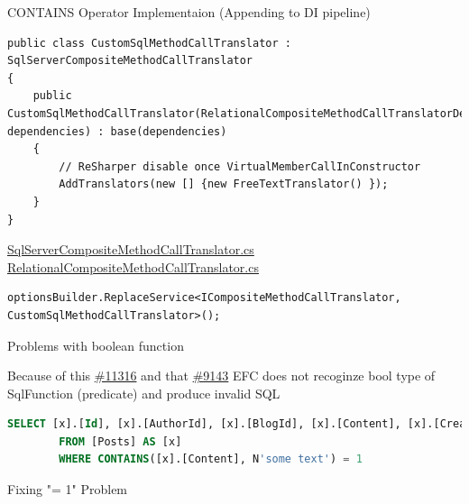 \documentclass{bredelebeamer}
\begin{document}
\begin{frame}[fragile]{CONTAINS Operator Implementaion (Appending to DI pipeline)}
    \begin{lstlisting}
public class CustomSqlMethodCallTranslator : SqlServerCompositeMethodCallTranslator
{
    public CustomSqlMethodCallTranslator(RelationalCompositeMethodCallTranslatorDependencies dependencies) : base(dependencies)
    {
        // ReSharper disable once VirtualMemberCallInConstructor
        AddTranslators(new [] {new FreeTextTranslator() });
    }
}
    \end{lstlisting}
    \href{https://github.com/aspnet/EntityFrameworkCore/blob/dev/src/EFCore.SqlServer/Query/ExpressionTranslators/Internal/SqlServerCompositeMethodCallTranslator.cs}{SqlServerCompositeMethodCallTranslator.cs}
    \href{https://github.com/aspnet/EntityFrameworkCore/blob/dev/src/EFCore.Relational/Query/ExpressionTranslators/RelationalCompositeMethodCallTranslator.cs\#L56}{RelationalCompositeMethodCallTranslator.cs}

    \begin{lstlisting}
optionsBuilder.ReplaceService<ICompositeMethodCallTranslator, CustomSqlMethodCallTranslator>();
    \end{lstlisting}
\end{frame}

\begin{frame}[fragile]{Problems with boolean function}
    \begin{block}{}
        Because of this \href{https://github.com/aspnet/EntityFrameworkCore/issues/11316}{\#11316} and that \href{https://github.com/aspnet/EntityFrameworkCore/issues/9143}{\#9143}
        EFC does not recoginze bool type of SqlFunction (predicate) and produce invalid SQL
    \end{block}
    \begin{lstlisting}[language=SQL]
    SELECT [x].[Id], [x].[AuthorId], [x].[BlogId], [x].[Content], [x].[Created], [x].[Rating], [x].[Title]
        FROM [Posts] AS [x]
        WHERE CONTAINS([x].[Content], N'some text') = 1
    \end{lstlisting}
\end{frame}
\begin{frame}[fragile]{Fixing "= 1" Problem}
    
\end{frame}
\end{document}
